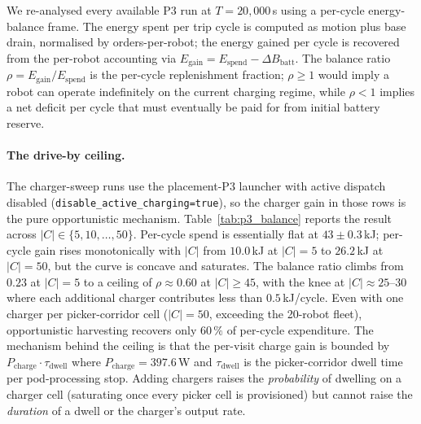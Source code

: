\documentclass[conference]{IEEEtran}
\begin{document}
We re-analysed every available P3 run at $T = 20{,}000$\,s using a per-cycle energy-balance frame. The energy spent per trip cycle is computed as motion plus base drain, normalised by orders-per-robot; the energy gained per cycle is recovered from the per-robot accounting via $E_\text{gain} = E_\text{spend} - \Delta B_\text{batt}$. The balance ratio $\rho = E_\text{gain}/E_\text{spend}$ is the per-cycle replenishment fraction; $\rho \geq 1$ would imply a robot can operate indefinitely on the current charging regime, while $\rho < 1$ implies a net deficit per cycle that must eventually be paid for from initial battery reserve.

\paragraph{The drive-by ceiling.}
The charger-sweep runs use the placement-P3 launcher with active dispatch disabled (\texttt{disable\_active\_charging=true}), so the charger gain in those rows is the pure opportunistic mechanism. Table~\ref{tab:p3_balance} reports the result across $|C| \in \{5, 10, \ldots, 50\}$. Per-cycle spend is essentially flat at $43 \pm 0.3$\,kJ; per-cycle gain rises monotonically with $|C|$ from $10.0$\,kJ at $|C| = 5$ to $26.2$\,kJ at $|C| = 50$, but the curve is concave and saturates. The balance ratio climbs from $0.23$ at $|C| = 5$ to a ceiling of $\rho \approx 0.60$ at $|C| \geq 45$, with the knee at $|C| \approx 25$--$30$ where each additional charger contributes less than $0.5$\,kJ/cycle. Even with one charger per picker-corridor cell ($|C| = 50$, exceeding the 20-robot fleet), opportunistic harvesting recovers only $60\,\%$ of per-cycle expenditure. The mechanism behind the ceiling is that the per-visit charge gain is bounded by $P_\text{charge} \cdot \tau_\text{dwell}$ where $P_\text{charge} = 397.6$\,W and $\tau_\text{dwell}$ is the picker-corridor dwell time per pod-processing stop. Adding chargers raises the \emph{probability} of dwelling on a charger cell (saturating once every picker cell is provisioned) but cannot raise the \emph{duration} of a dwell or the charger's output rate.
\end{document}
